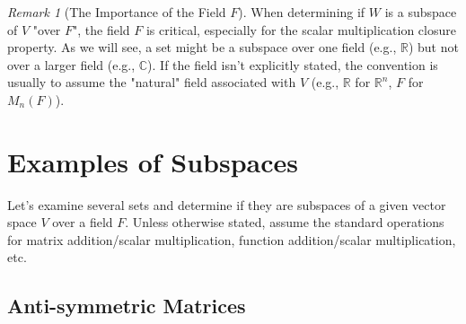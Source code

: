 \documentclass[11pt]{article}
\theoremstyle{definition}
\theoremstyle{remark}
\newtheorem{remark}[theorem]{Remark}
\begin{document}
\begin{remark}[The Importance of the Field $F$]
When determining if $W$ is a subspace of $V$ "over $F$", the field $F$ is critical, especially for the scalar multiplication closure property. As we will see, a set might be a subspace over one field (e.g., $\mathbb{R}$) but not over a larger field (e.g., $\mathbb{C}$). If the field isn't explicitly stated, the convention is usually to assume the "natural" field associated with $V$ (e.g., $\mathbb{R}$ for $\mathbb{R}^n$, $F$ for $M_n(F)$).
\end{remark}

\section{Examples of Subspaces}

Let's examine several sets and determine if they are subspaces of a given vector space $V$ over a field $F$. Unless otherwise stated, assume the standard operations for matrix addition/scalar multiplication, function addition/scalar multiplication, etc.

\subsection{Anti-symmetric Matrices}
\end{document}
